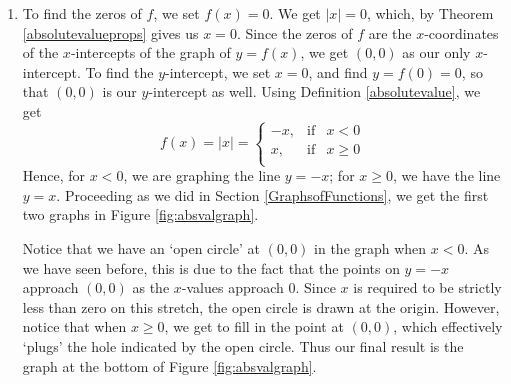 {
\begin{enumerate}

\item  To find the zeros of $f$, we set $f(x)= 0$.  We get $|x|=0$, which, by Theorem \ref{absolutevalueprops} gives us $x=0$.  Since the zeros of $f$ are the $x$-coordinates of the $x$-intercepts of the graph of $y=f(x)$, we get $(0,0)$ as our only $x$-intercept.  To find the $y$-intercept, we set $x=0$, and find $y = f(0) = 0$, so that $(0,0)$ is our $y$-intercept as well. Using Definition \ref{absolutevalue}, we get \[ f(x) = |x| =  \left\{ \begin{array}{rcl} -x, & \mbox{if} & x < 0  \\ x, & \mbox{if} & x \geq 0 \\ \end{array} \right.\]  Hence, for $x < 0$, we are graphing the line $y = -x$;  for $x \geq 0$, we have the line $y = x$.  Proceeding as we did in Section \ref{GraphsofFunctions}, we get the first two graphs in Figure \ref{fig:absvalgraph}.



\medskip

Notice that we have an `open circle' at $(0,0)$ in the graph when $x<0$. As we have seen before, this is due to the fact that the points on $y = -x$ approach $(0,0)$ as the $x$-values approach $0$.  Since $x$ is required to be strictly less than zero on this stretch, the open circle is drawn at the origin.  However, notice that when $x \geq 0$, we get to fill in the point at $(0,0)$, which effectively `plugs' the hole indicated by the open circle.  Thus our final result is the graph at the bottom of Figure \ref{fig:absvalgraph}.



\end{enumerate}}

